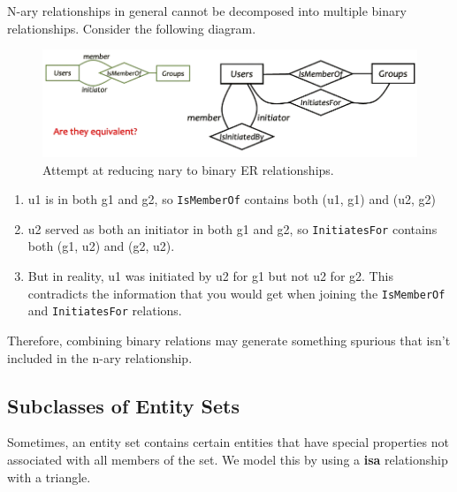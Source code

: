     \begin{example}
      N-ary relationships in general cannot be decomposed into multiple binary relationships. Consider the following diagram. 
      \begin{figure}[H]
        \centering 
        \includegraphics[scale=0.4]{img/nary_vs_binary.png}
        \caption{Attempt at reducing nary to binary ER relationships. } 
        \label{fig:}
      \end{figure}
      \begin{enumerate}
        \item u1 is in both g1 and g2, so \texttt{IsMemberOf} contains both (u1, g1) and (u2, g2)
        \item u2 served as both an initiator in both g1 and g2, so \texttt{InitiatesFor} contains both (g1, u2) and (g2, u2). 
        \item But in reality, u1 was initiated by u2 for g1 but not u2 for g2. This contradicts the information that you would get when joining the \texttt{IsMemberOf} and \texttt{InitiatesFor} relations. 
      \end{enumerate}
      Therefore, combining binary relations may generate something spurious that isn't included in the n-ary relationship. 
    \end{example}

\subsection{Subclasses of Entity Sets}

  Sometimes, an entity set contains certain entities that have special properties not associated with all members of the set. We model this by using a \textbf{isa} relationship with a triangle. 
  
